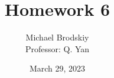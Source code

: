 


\title{Homework 6}
\date{March 29, 2023}
\author{Michael Brodskiy\\ \small Professor: Q. Yan}



\maketitle

\newpage

